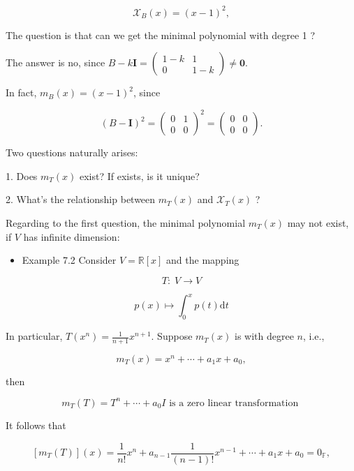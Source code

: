 \documentclass[11pt]{article}
\begin{document}
\[
{\mathcal{X}}_{B}\left( x\right)  = {\left( x - 1\right) }^2,
\]

The question is that can we get the minimal polynomial with degree 1 ?

The answer is no, since \(B - k\mathbf{I} = \left( \begin{matrix} 1 - k & 1 \\  0 & 1 - k \end{matrix}\right)  \neq  \mathbf{0}\).

In fact, \({m}_{B}\left( x\right)  = {\left( x - 1\right) }^2\), since

\[
{\left( B - \mathbf{I}\right) }^2 = {\left( \begin{array}{ll} 0 & 1 \\  0 & 0 \end{array}\right) }^2 = \left( \begin{array}{ll} 0 & 0 \\  0 & 0 \end{array}\right) .
\]

Two questions naturally arises:

1. Does \({m}_{T}\left( x\right)\) exist? If exists, is it unique?

2. What’s the relationship between \({m}_{T}\left( x\right)\) and \({\mathcal{X}}_{T}\left( x\right)\) ?

Regarding to the first question, the minimal polynomial \({m}_{T}\left( x\right)\) may not exist, if \(V\) has infinite dimension:

\begin{itemize}
\item Example 7.2 Consider \(V = \mathbb{R}\left\lbrack  x\right\rbrack\) and the mapping
\end{itemize}

\[
T : \;V \rightarrow  V
\]

\[
p\left( x\right)  \mapsto  {\int }_{0}^{x}p\left( t\right) \mathrm{d}t
\]

In particular, \(T\left( {x}^n\right)  = \frac1{n + 1}{x}^{n + 1}\). Suppose \({m}_{T}\left( x\right)\) is with degree \(n\), i.e.,

\[
{m}_{T}\left( x\right)  = {x}^n + \cdots  + {a}_1x + {a}_{0},
\]

then

\[
{m}_{T}\left( T\right)  = {T}^n + \cdots  + {a}_{0}I\text{ is a zero linear transformation }
\]

It follows that

\[
\left\lbrack  {{m}_{T}\left( T\right) }\right\rbrack  \left( x\right)  = \frac1{n!}{x}^n + {a}_{n - 1}\frac1{\left( {n - 1}\right) !}{x}^{n - 1} + \cdots  + {a}_1x + {a}_{0} = {0}_{\mathbb{F}},
\]
\end{document}
